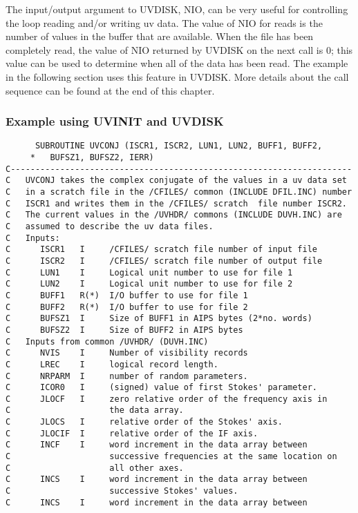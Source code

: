 The input/output argument to UVDISK, NIO, can be very useful for
controlling the loop reading and/or writing uv data.  The value of NIO
for reads is the number of values in the buffer that are available.
When the file has been completely read, the value of NIO returned by
UVDISK on the next call is 0; this value can be used to determine when
all of the data has been read.  The example in the following section
uses this feature in UVDISK. More details about the call sequence can
be found at the end of this chapter.

\subsubsection{Example using UVINIT and UVDISK}

\begin{verbatim}
      SUBROUTINE UVCONJ (ISCR1, ISCR2, LUN1, LUN2, BUFF1, BUFF2,
     *   BUFSZ1, BUFSZ2, IERR)
C---------------------------------------------------------------------
C   UVCONJ takes the complex conjugate of the values in a uv data set
C   in a scratch file in the /CFILES/ common (INCLUDE DFIL.INC) number
C   ISCR1 and writes them in the /CFILES/ scratch  file number ISCR2.
C   The current values in the /UVHDR/ commons (INCLUDE DUVH.INC) are
C   assumed to describe the uv data files.
C   Inputs:
C      ISCR1   I     /CFILES/ scratch file number of input file
C      ISCR2   I     /CFILES/ scratch file number of output file
C      LUN1    I     Logical unit number to use for file 1
C      LUN2    I     Logical unit number to use for file 2
C      BUFF1   R(*)  I/O buffer to use for file 1
C      BUFF2   R(*)  I/O buffer to use for file 2
C      BUFSZ1  I     Size of BUFF1 in AIPS bytes (2*no. words)
C      BUFSZ2  I     Size of BUFF2 in AIPS bytes
C   Inputs from common /UVHDR/ (DUVH.INC)
C      NVIS    I     Number of visibility records
C      LREC    I     logical record length.
C      NRPARM  I     number of random parameters.
C      ICOR0   I     (signed) value of first Stokes' parameter.
C      JLOCF   I     zero relative order of the frequency axis in
C                    the data array.
C      JLOCS   I     relative order of the Stokes' axis.
C      JLOCIF  I     relative order of the IF axis.
C      INCF    I     word increment in the data array between
C                    successive frequencies at the same location on
C                    all other axes.
C      INCS    I     word increment in the data array between
C                    successive Stokes' values.
C      INCS    I     word increment in the data array between

\end{verbatim}
